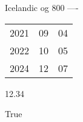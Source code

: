 \documentclass[10pt,a4paper]{article}
\begin{document}
	Icelandic og 800 ----

	\begin{tabular}{lll}
		2021 & 09 & 04\\
		2022 & 10 & 05\\
		2024 & 12 & 07
	\end{tabular}


	12.34
	
	
	True
\end{document}
